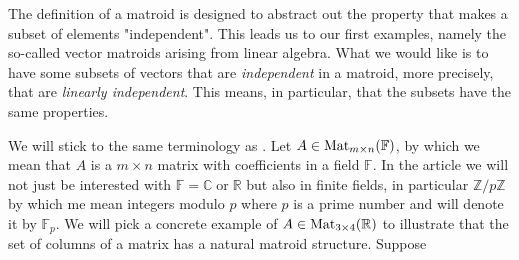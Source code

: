 \begin{center}
\end{center}

The definition of a matroid is designed to abstract out the property that makes a subset of elements "independent". This leads us to our first examples, namely the so-called vector matroids arising from linear algebra. What we would like is to have some subsets of vectors that are \textit{independent} in a matroid, more precisely, that are \textit{linearly independent}. This means, in particular, that the subsets have the same properties.

We will stick to the same terminology as \cite{oxley1}. Let $A \in \text{Mat}_{m \times n}(\mathbb{F})$, by which we mean that $A$ is a $m \times n$ matrix with coefficients in a field $\mathbb{F}$. In the article we will not just be interested with $\mathbb{F} = \mathbb{C} \; \mathrm{or}\; \mathbb{R} $ but also in finite fields, in particular $\mathbb{Z} / p\mathbb{Z}$ by which me mean integers modulo $p$ where $p$ is a prime number and will denote it by $\mathbb{F}_p$. We will pick a concrete example of $A \in  \text{Mat}_{3 \times 4}(\mathbb{R})$ to illustrate that the set of columns of a matrix has a natural matroid structure. Suppose

